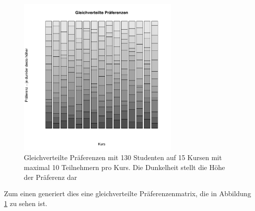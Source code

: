 			\begin{figure}
				\centering
				\includegraphics[width=0.7\textwidth]{./testing/images/EqualDistPreferencesDist.jpg}
				\caption{Gleichverteilte Präferenzen mit 130 Studenten auf 15 Kursen mit maximal 10 Teilnehmern pro Kurs. Die Dunkelheit stellt die Höhe der Präferenz dar}
				\label{fig:test_equal_distribution}
			\end{figure}
			Zum einen generiert dies eine gleichverteilte Präferenzenmatrix, die in Abbildung \ref{fig:test_equal_distribution} zu sehen ist.
